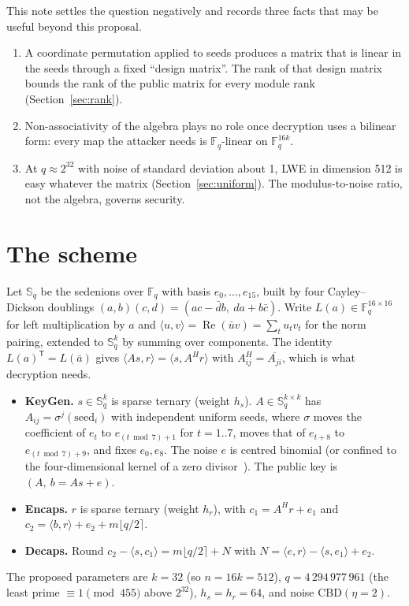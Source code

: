 \documentclass[11pt]{article}
\theoremstyle{remark}
\newcommand{\F}{\mathbb{F}}
\newcommand{\Sed}{\mathbb{S}}
\DeclareMathOperator{\re}{Re}
\begin{document}
This note settles the question negatively and records three facts that may be useful beyond this proposal.
\begin{enumerate}
\item A coordinate permutation applied to seeds produces a matrix that is linear in the seeds through a fixed
  ``design matrix''. The rank of that design matrix bounds the rank of the public matrix for every module rank
  (Section~\ref{sec:rank}).
\item Non-associativity of the algebra plays no role once decryption uses a bilinear form: every map the attacker needs
  is $\F_q$-linear on $\F_q^{16k}$.
\item At $q\approx2^{32}$ with noise of standard deviation about 1, LWE in dimension 512 is easy whatever the matrix
  (Section~\ref{sec:uniform}). The modulus-to-noise ratio, not the algebra, governs security.
\end{enumerate}

\section{The scheme}

Let $\Sed_q$ be the sedenions over $\F_q$ with basis $e_0,\dots,e_{15}$, built by four Cayley--Dickson doublings
$(a,b)(c,d)=(ac-\bar d b,\ da+b\bar c)$. Write $L(a)\in\F_q^{16\times16}$ for left multiplication by $a$ and
$\langle u,v\rangle=\re(\bar u v)=\sum_t u_t v_t$ for the norm pairing, extended to $\Sed_q^k$ by summing over
components. The identity $L(a)^{\mathsf T}=L(\bar a)$ gives $\langle A s,r\rangle=\langle s,A^{H}r\rangle$ with
$A^{H}_{ij}=\overline{A_{ji}}$, which is what decryption needs.

\begin{itemize}
\item \textbf{KeyGen.} $s\in\Sed_q^k$ is sparse ternary (weight $h_s$). $A\in\Sed_q^{k\times k}$ has
  $A_{ij}=\sigma^{j}(\mathrm{seed}_i)$ with independent uniform seeds, where $\sigma$ moves the coefficient of $e_t$ to
  $e_{(t\bmod7)+1}$ for $t=1..7$, moves that of $e_{t+8}$ to $e_{(t\bmod7)+9}$, and fixes $e_0,e_8$. The noise $e$ is
  centred binomial (or confined to the four-dimensional kernel of a zero divisor~\cite{Moreno}). The public key is $(A,\ b=As+e)$.
\item \textbf{Encaps.} $r$ is sparse ternary (weight $h_r$), with $c_1=A^{H}r+e_1$ and
  $c_2=\langle b,r\rangle+e_2+m\lfloor q/2\rceil$.
\item \textbf{Decaps.} Round $c_2-\langle s,c_1\rangle=m\lfloor q/2\rceil+N$ with
  $N=\langle e,r\rangle-\langle s,e_1\rangle+e_2$.
\end{itemize}
The proposed parameters are $k=32$ (so $n=16k=512$), $q=4\,294\,977\,961$ (the least prime $\equiv1\pmod{455}$ above
$2^{32}$), $h_s=h_r=64$, and noise CBD$(\eta=2)$.
\end{document}
